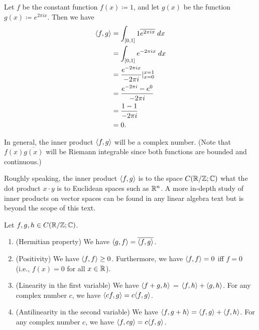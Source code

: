 \begin{eg}\label{5.2.3}
  Let \(f\) be the constant function \(f(x) \coloneqq 1\), and let \(g(x)\) be the function \(g(x) \coloneqq e^{2 \pi i x}\).
  Then we have
  \begin{align*}
    \inner*{f, g} & = \int_{[0, 1]} 1 \overline{e^{2 \pi i x}} \; dx       \\
                  & = \int_{[0, 1]} e^{- 2 \pi i x} \; dx                  \\
                  & = \dfrac{e^{- 2 \pi i x}}{- 2 \pi i} |_{x = 0}^{x = 1} \\
                  & = \dfrac{e^{- 2 \pi i } - e^0}{- 2 \pi i}              \\
                  & = \dfrac{1 - 1}{- 2 \pi i}                             \\
                  & = 0.
  \end{align*}
\end{eg}

\begin{rmk}\label{5.2.4}
  In general, the inner product \(\inner*{f, g}\) will be a complex number.
  (Note that \(f(x) \overline{g(x)}\) will be Riemann integrable since both functions are bounded and continuous.)
\end{rmk}

\begin{note}
  Roughly speaking, the inner product \(\inner*{f, g}\) is to the space \(C(\R / \Z ; \C)\) what the dot product \(x \cdot y\) is to Euclidean spaces such as \(\R^n\).
  A more in-depth study of inner products on vector spaces can be found in any linear algebra text but is beyond the scope of this text.
\end{note}

\begin{lem}\label{5.2.5}
  Let \(f, g, h \in C(\R / \Z ; \C)\).
  \begin{enumerate}
    \item (Hermitian property)
          We have \(\inner*{g, f} = \overline{\inner*{f, g}}\).
    \item (Positivity)
          We have \(\inner*{f, f} \geq 0\).
          Furthermore, we have \(\inner*{f, f} = 0\) iff \(f = 0\)
          (i.e., \(f(x) = 0\) for all \(x \in \R\)).
    \item (Linearity in the first variable)
          We have \(\inner*{f +g, h}\) = \(\inner*{f, h} + \inner*{g, h}\).
          For any complex number \(c\), we have \(\inner*{cf, g} = c \inner*{f, g}\).
    \item (Antilinearity in the second variable)
          We have \(\inner*{f, g + h} = \inner*{f, g} + \inner*{f, h}\).
          For any complex number \(c\), we have \(\inner*{f, cg} = c \inner*{f, g}\).
  \end{enumerate}
\end{lem}

